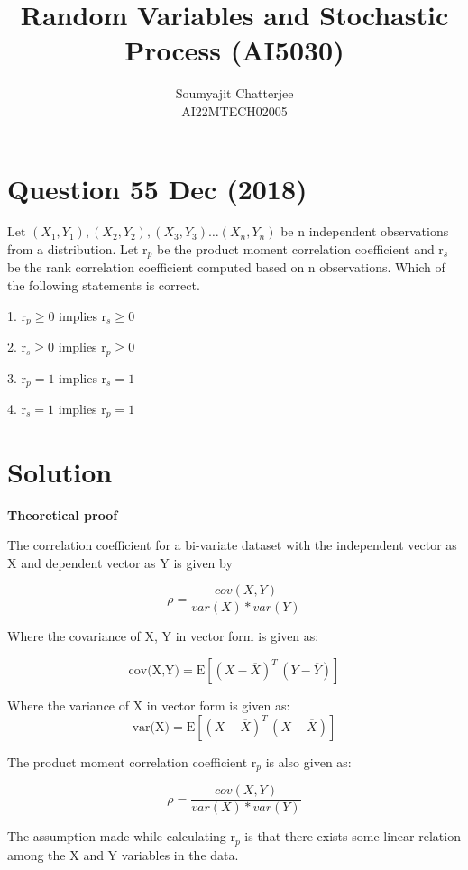 \documentclass[12pt]{article}
\title{Random Variables and Stochastic Process (AI5030)}
\author{Soumyajit Chatterjee\\AI22MTECH02005 }
\begin{document}
\maketitle

\section*{Question 55 Dec (2018)}
Let $(X_1, Y_1), (X_2, Y_2), (X_3, Y_3) \dotsc (X_n, Y_n)$ be n independent observations from a distribution. Let r$_p$ be the product moment correlation coefficient and r$_s$ be the rank correlation coefficient computed based on n observations. Which of the following statements is correct. 

1. r$_p \geqslant 0$ implies r$_s \geqslant 0$

2. r$_s \geqslant 0$ implies r$_p \geqslant 0$

3. r$_p = 1 $ implies r$_s = 1$

4. r$_s = 1 $ implies r$_p = 1$

\section*{Solution}

\textbf{Theoretical proof}

\noindent The correlation coefficient for a bi-variate dataset with the independent vector as X and dependent vector as Y is given by

$$
\rho = \dfrac{cov(X,Y)}{var(X) * var(Y)}
$$

\vspace{4mm}
Where the covariance of X, Y in vector form is given as:

$$
\text{cov(X,Y)} = \text{E}[(X-\overline{X})^T \, (Y-\overline{Y})]
$$

\vspace{4mm}
Where the variance of X in vector form is given as:
$$
\text{var(X)} = \text{E}[(X-\overline{X})^T \, (X-\overline{X})]
$$

\noindent The product moment correlation coefficient r$_p$ is also given as:

$$
\rho = \dfrac{cov(X,Y)}{var(X) * var(Y)}
$$

\vspace{2mm}

\noindent The assumption made while calculating r$_p$ is that there exists some linear relation among the X and Y variables in the data.

\vspace{3mm}
\end{document}

